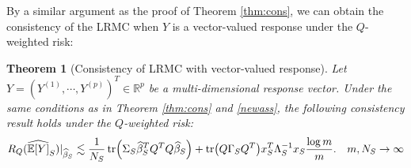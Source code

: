 \documentclass[11pt,a4paper]{amsart}
\numberwithin{equation}{section}
\theoremstyle{plain}
\newtheorem{Th}{Theorem}
\theoremstyle{definition}
\def\R{{\mathbb R}}
\def\E{{\mathbb E}}
\def\R{{\mathbb R}}
\begin{document}
By a similar argument as the proof of Theorem \ref{thm:cons}, we can obtain the consistency of the LRMC when $Y$ is a vector-valued response under the $Q$-weighted risk:  


\begin{Th}[Consistency of LRMC with vector-valued response]\label{thm:consv}
Let $Y = (Y^{(1)}, \cdots, Y^{(p)})^T\in\R^p$ be a multi-dimensional response vector.
Under the same conditions as in Theorem \ref{thm:cons} and \eqref{newass},
the following consistency result holds under the $Q$-weighted risk:
\begin{align}
&R_Q(\widehat{\E[Y]}_S)|_{\widehat{\beta}_S} \lesssim \frac{1}{N_S}\tr(\Sigma_S\widehat{\beta}_S^TQ^TQ\widehat{\beta}_S) + \tr(Q\Gamma_SQ^T)x_S^T\Lambda_S^{-1}x_S\frac{\log m}{m}.&m, N_S\to\infty\label{sd}
\end{align}
\end{Th}
\end{document}
